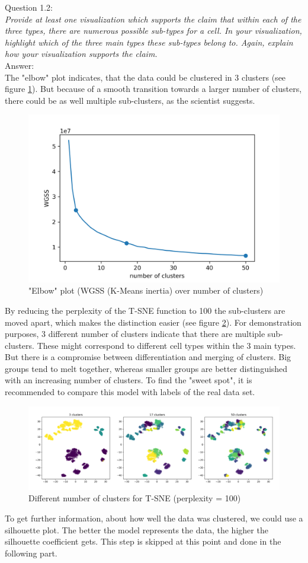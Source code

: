 
Question 1.2:\\	
\textsl{Provide at least one visualization which supports the claim that within each of the three types, there are numerous possible sub-types for a cell. In your visualization, highlight which of the three main types these sub-types belong to. Again, explain how your visualization supports the claim.}\\

Answer:\\
The "elbow" plot indicates, that the data could be clustered in 3 clusters (see figure \ref{fig:elbow_plot}). But because of a smooth transition towards a larger number of clusters, there could be as well multiple sub-clusters, as the scientist suggests.\\

\begin{figure}[h]
	\centering
	\includegraphics[width=0.5\linewidth]{problem_02/elbow_plot}
	\caption{"Elbow" plot (WGSS (K-Means inertia) over number of clusters)}
	\label{fig:elbow_plot}
\end{figure}

By reducing the perplexity of the T-SNE function to 100 the sub-clusters are moved apart, which makes the distinction easier (see figure \ref{fig:number_clusters_TSNE}). For demonstration purposes, 3 different number of clusters indicate that there are multiple sub-clusters. These might correspond to different cell types within the 3 main types. But there is a compromise between differentiation and merging of clusters. Big groups tend to melt together, whereas smaller groups are better distinguished with an increasing number of clusters. To find the "sweet spot", it is recommended to compare this model with labels of the real data set.\\

\begin{figure}[h]
	\centering
	\includegraphics[width=1\linewidth]{problem_02/number_clusters_TSNE}
	\caption{Different number of clusters for T-SNE (perplexity = 100)}
	\label{fig:number_clusters_TSNE}
\end{figure}

To get further information, about how well the data was clustered, we could use a silhouette plot. The better the model represents the data, the higher the silhouette coefficient gets. This step is skipped at this point and done in the following part.\\